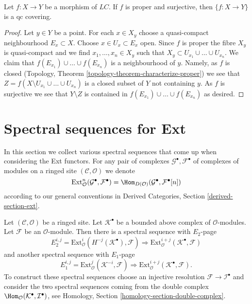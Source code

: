 \begin{lemma}
\label{lemma-proper-surjective-is-qc-covering}
Let $f : X \to Y$ be a morphism of $\textit{LC}$.
If $f$ is proper and surjective, then $\{f : X \to Y\}$
is a qc covering.
\end{lemma}

\begin{proof}
Let $y \in Y$ be a point. For each $x \in X_y$ choose a quasi-compact
neighbourhood $E_x \subset X$. Choose $x \in U_x \subset E_x$ open.
Since $f$ is proper the fibre $X_y$ is quasi-compact and we find
$x_1, \ldots, x_n \in X_y$ such that
$X_y \subset U_{x_1} \cup \ldots \cup U_{x_n}$.
We claim that $f(E_{x_1}) \cup \ldots \cup f(E_{x_n})$ is a neighbourhood of
$y$. Namely, as $f$ is closed
(Topology, Theorem \ref{topology-theorem-characterize-proper})
we see that $Z = f(X \setminus U_{x_1} \cup \ldots \cup U_{x_n})$
is a closed subset of $Y$ not containing $y$. As $f$ is surjective
we see that $Y \setminus Z$ is contained in
$f(E_{x_1}) \cup \ldots \cup f(E_{x_n})$ as desired.
\end{proof}










\section{Spectral sequences for Ext}
\label{section-spectral-sequence-ext}

\noindent
In this section we collect various spectral sequences that come up
when considering the Ext functors. For any pair of complexes
$\mathcal{G}^\bullet, \mathcal{F}^\bullet$ of complexes of modules
on a ringed site $(\mathcal{C}, \mathcal{O})$ we denote
$$
\text{Ext}^n_\mathcal{O}(\mathcal{G}^\bullet, \mathcal{F}^\bullet)
=
\Hom_{D(\mathcal{O})}(\mathcal{G}^\bullet, \mathcal{F}^\bullet[n])
$$
according to our general conventions in
Derived Categories, Section \ref{derived-section-ext}.

\begin{example}
\label{example-hom-complex-into-sheaf}
Let $(\mathcal{C}, \mathcal{O})$ be a ringed site.
Let $\mathcal{K}^\bullet$ be a bounded above complex of $\mathcal{O}$-modules.
Let $\mathcal{F}$ be an $\mathcal{O}$-module. Then there is a
spectral sequence with $E_2$-page
$$
E_2^{i, j} =
\text{Ext}_\mathcal{O}^i(H^{-j}(\mathcal{K}^\bullet), \mathcal{F})
\Rightarrow
\text{Ext}_\mathcal{O}^{i + j}(\mathcal{K}^\bullet, \mathcal{F})
$$
and another spectral sequence with $E_1$-page
$$
E_1^{i, j} =
\text{Ext}_\mathcal{O}^j(\mathcal{K}^{-i}, \mathcal{F})
\Rightarrow
\text{Ext}_\mathcal{O}^{i + j}(\mathcal{K}^\bullet, \mathcal{F}).
$$
To construct these spectral sequences choose an injective resolution
$\mathcal{F} \to \mathcal{I}^\bullet$ and consider the two spectral
sequences coming from the double complex
$\Hom_\mathcal{O}(\mathcal{K}^\bullet, \mathcal{I}^\bullet)$, see
Homology, Section \ref{homology-section-double-complex}.
\end{example}








